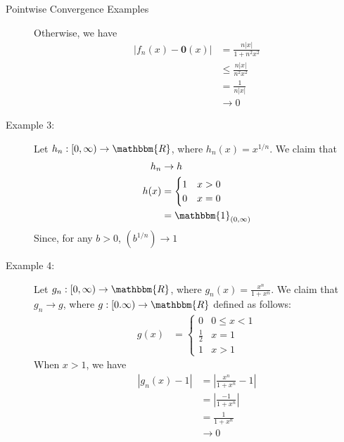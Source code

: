 \documentclass[10pt]{extarticle}
\renewcommand{\mathbf}[1]{\mathbold{#1}}
\newcommand{\R}{\mathbbm{R}}
\begin{document}
\begin{problem}{Pointwise Convergence Examples}
\begin{description}
        Otherwise, we have
        \begin{align*}
          \left|f_n(x) - \mathbf{0}(x)\right| &= \frac{n|x|}{1 + n^2x^2}\\
                                              &\leq \frac{n|x|}{n^2x^2}\\
                                              &= \frac{1}{n|x|}\\
                                              &\rightarrow 0
        \end{align*}
      \item[Example 3:] Let $h_n: [0,\infty)\rightarrow \R$, where $h_n(x) = x^{1/n}$. We claim that
        \begin{align*}
          h_{n} &\rightarrow h\\
          h(x) &= \begin{cases}
            1 & x > 0\\
            0 & x = 0
          \end{cases}\\
               &= \mathbbm{1}_{(0,\infty)}
        \end{align*}
        Since, for any $b > 0$, $\left(b^{1/n}\right)\rightarrow 1$
      \item[Example 4:] Let $g_n: [0,\infty) \rightarrow \R$, where $g_n(x) = \frac{x^n}{1 + x^n}$. We claim that $g_n \rightarrow g$, where $g: [0.\infty) \rightarrow \R$ defined as follows:
        \begin{align*}
          g(x) &= \begin{cases}
            0 & 0 \leq x < 1\\
            \frac{1}{2} & x = 1\\
            1 & x > 1
          \end{cases}
        \end{align*}
        When $x > 1$, we have
        \begin{align*}
          \left|g_n(x) - 1\right| &= \left|\frac{x^n}{1 + x^n} - 1\right|\\
                                  &= \left|\frac{-1}{1 + x^n}\right|\\
                                  &= \frac{1}{1+x^n}\\
                                  &\rightarrow 0
        \end{align*}
    \end{description}
  \end{problem}
\end{document}
